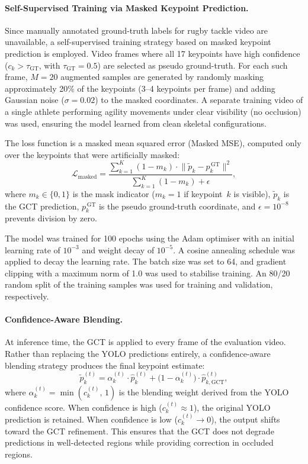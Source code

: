 \documentclass{article}
\begin{document}
\paragraph{Self-Supervised Training via Masked Keypoint Prediction.}
Since manually annotated ground-truth labels for rugby tackle video are
unavailable, a self-supervised training strategy based on masked keypoint
prediction is employed.
Video frames where all 17 keypoints have high confidence
($c_k > \tau_{\mathrm{GT}}$, with $\tau_{\mathrm{GT}} = 0.5$) are
selected as pseudo ground-truth.
For each such frame, $M = 20$ augmented samples are generated by
randomly masking approximately 20\% of the keypoints (3--4 keypoints per
frame) and adding Gaussian noise ($\sigma = 0.02$) to the masked
coordinates.
A separate training video of a single athlete performing agility
movements under clear visibility (no occlusion) was used, ensuring the
model learned from clean skeletal configurations.

The loss function is a masked mean squared error (Masked MSE), computed
only over the keypoints that were artificially masked:
\begin{equation}
  \mathcal{L}_{\mathrm{masked}}
    = \frac{
        \sum_{k=1}^{K} (1 - m_k) \cdot
        \bigl\| \tilde{p}_k - p_k^{\,\mathrm{GT}} \bigr\|^2
      }{
        \sum_{k=1}^{K} (1 - m_k) + \epsilon
      },
  \label{eq:masked_loss}
\end{equation}
where $m_k \in \{0, 1\}$ is the mask indicator ($m_k = 1$ if
keypoint~$k$ is visible), $\tilde{p}_k$ is the GCT prediction,
$p_k^{\,\mathrm{GT}}$ is the pseudo ground-truth coordinate, and
$\epsilon = 10^{-8}$ prevents division by zero.

The model was trained for 100 epochs using the Adam optimiser with an
initial learning rate of $10^{-3}$ and weight decay of $10^{-5}$.
A cosine annealing schedule was applied to decay the learning rate.
The batch size was set to 64, and gradient clipping with a maximum norm
of 1.0 was used to stabilise training.
An 80/20 random split of the training samples was used for training and
validation, respectively.

\paragraph{Confidence-Aware Blending.}
At inference time, the GCT is applied to every frame of the evaluation
video.
Rather than replacing the YOLO predictions entirely, a
confidence-aware blending strategy produces the final keypoint estimate:
\begin{equation}
  \tilde{p}_k^{(t)}
    = \alpha_k^{(t)} \cdot \hat{p}_k^{(t)}
      + \bigl(1 - \alpha_k^{(t)}\bigr) \cdot \hat{p}_{k,\mathrm{GCT}}^{(t)},
  \label{eq:blending}
\end{equation}
where $\alpha_k^{(t)} = \min(c_k^{(t)},\, 1)$ is the blending weight
derived from the YOLO confidence score.
When confidence is high ($c_k^{(t)} \approx 1$), the original YOLO
prediction is retained.
When confidence is low ($c_k^{(t)} \to 0$), the output shifts toward
the GCT refinement.
This ensures that the GCT does not degrade predictions in well-detected
regions while providing correction in occluded regions.
\end{document}
